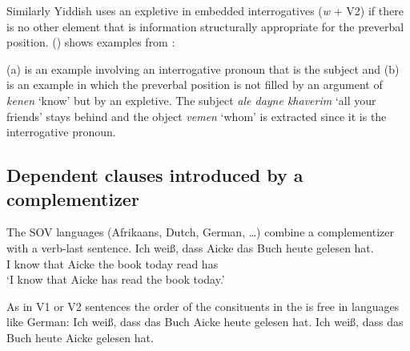 Similarly Yiddish uses an expletive in embedded interrogatives (\emph{w} + V2) if 
there is no other element that is information structurally appropriate for the preverbal position.
() shows examples from \citet[--404]{Prince89a}:

\eal
\label{ex-Yiddish-interrogatives-expletive}
\zl
(a) is an example involving an interrogative pronoun that is the subject and (b) is an
example in which the preverbal position is not filled by an argument of \emph{kenen} `know' but by
an expletive. The subject \emph{ale dayne khaverim} `all your friends' stays behind and the object
\emph{vemen} `whom' is extracted since it is the interrogative pronoun.


\subsection{Dependent clauses introduced by a complementizer}


The SOV languages (Afrikaans, Dutch, German, \ldots) combine a complementizer with a verb-last sentence.
\ea
\gll Ich weiß, dass Aicke das Buch heute gelesen hat.\\
     I   know  that Aicke the book today read    has\\
\glt `I know that Aicke has read the book today.'
\z

As in V1 or V2 sentences the order of the consituents in the \mf is free in languages like German:
\eal
\ex Ich weiß, dass das Buch Aicke heute gelesen hat.
\ex Ich weiß, dass das Buch heute Aicke gelesen hat.
\zl

